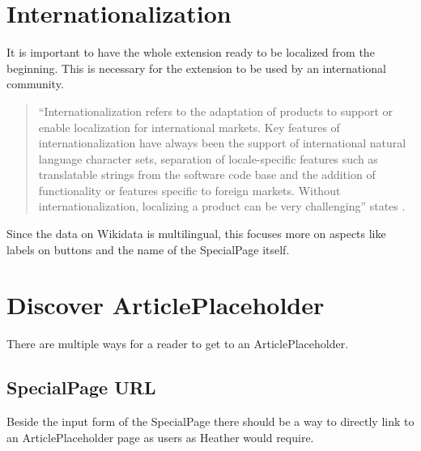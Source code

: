 \section{Internationalization}
It is important to have the whole extension ready to be localized from the beginning. This is necessary for the extension to be used by an international community. \\ 
\begin{quote}
``Internationalization refers to the adaptation of products to support or enable localization for international markets. Key features of internationalization have always been the support of international natural language character sets, separation of locale-specific features such as translatable strings from the software code base and the addition of functionality or features specific to foreign markets. Without internationalization, localizing a product can be very challenging'' states \citet[23]{localization}. 
\end{quote}
Since the data on Wikidata is multilingual, this focuses more on aspects like labels on buttons and the name of the SpecialPage itself.

\section{Discover ArticlePlaceholder}

There are multiple ways for a reader to get to an ArticlePlaceholder. 

\subsection{SpecialPage URL}
Beside the input form of the SpecialPage there should be a way to directly link to an ArticlePlaceholder page as users as Heather would require.

